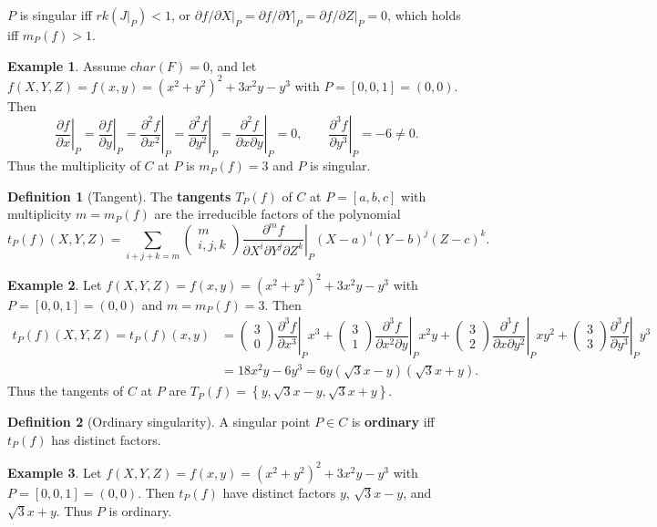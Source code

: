 \documentclass{article}
\newcommand{\val}[1]{\left. #1 \right\rvert}
\newcommand{\rb}[1]{\left( #1 \right)}
\renewcommand{\sb}[1]{\left[ #1 \right]}
\newcommand{\cb}[1]{\left\{ #1 \right\}}
\newcommand{\two}[2]{\begin{pmatrix} #1 \\ #2 \end{pmatrix}}
\theoremstyle{definition}\newtheorem*{definition}{Definition}
\theoremstyle{definition}\newtheorem*{example}{Example}
\theoremstyle{definition}\newtheorem*{remark}{Remark}
\begin{document}
$ P $ is singular iff $ rk\rb{\val{J}_P} < 1 $, or $ \val{\partial f / \partial X}_P = \val{\partial f / \partial Y}_P = \val{\partial f / \partial Z}_P = 0 $, which holds iff $ m_P\rb{f} > 1 $.

\begin{example}
Assume $ char\rb{F} = 0 $, and let $ f\rb{X, Y, Z} = f\rb{x, y} = \rb{x^2 + y^2}^2 + 3x^2y - y^3 $ with $ P = \sb{0, 0, 1} = \rb{0, 0} $. Then
$$ \val{\dfrac{\partial f}{\partial x}}_P = \val{\dfrac{\partial f}{\partial y}}_P = \val{\dfrac{\partial^2 f}{\partial x^2}}_P = \val{\dfrac{\partial^2 f}{\partial y^2}}_P = \val{\dfrac{\partial^2 f}{\partial x \partial y}}_P = 0, \qquad \val{\dfrac{\partial^3 f}{\partial y^3}}_P = -6 \ne 0. $$
Thus the multiplicity of $ C $ at $ P $ is $ m_P\rb{f} = 3 $ and $ P $ is singular.
\end{example}

\begin{definition}[Tangent]
The \textbf{tangents} $ T_P\rb{f} $ of $ C $ at $ P = \sb{a, b, c} $ with multiplicity $ m = m_P\rb{f} $ are the irreducible factors of the polynomial
$$ t_P\rb{f}\rb{X, Y, Z} = \sum_{i + j + k = m} \two{m}{i, j, k} \val{\dfrac{\partial^m f}{\partial X^i \partial Y^j \partial Z^k}}_P \rb{X - a}^i \rb{Y - b}^j \rb{Z - c}^k. $$
\end{definition}

\begin{example}
Let $ f\rb{X, Y, Z} = f\rb{x, y} = \rb{x^2 + y^2}^2 + 3x^2y - y^3 $ with $ P = \sb{0, 0, 1} = \rb{0, 0} $ and $ m = m_P\rb{f} = 3 $. Then
\begin{align*}
t_P\rb{f}\rb{X, Y, Z} = t_P\rb{f}\rb{x, y}
& = \two{3}{0}\val{\dfrac{\partial^3 f}{\partial x^3}}_Px^3 + \two{3}{1}\val{\dfrac{\partial^3 f}{\partial x^2 \partial y}}_Px^2y + \two{3}{2}\val{\dfrac{\partial^3 f}{\partial x \partial y^2}}_Pxy^2 + \two{3}{3}\val{\dfrac{\partial^3 f}{\partial y^3}}_Py^3 \\
& = 18x^2y - 6y^3 = 6y\rb{\sqrt{3}x - y}\rb{\sqrt{3}x + y}.
\end{align*}
Thus the tangents of $ C $ at $ P $ are $ T_P\rb{f} = \cb{y, \sqrt{3}x - y, \sqrt{3}x + y} $.
\end{example}

\begin{definition}[Ordinary singularity]
A singular point $ P \in C $ is \textbf{ordinary} iff $ t_P\rb{f} $ has distinct factors.
\end{definition}

\begin{example}
Let $ f\rb{X, Y, Z} = f\rb{x, y} = \rb{x^2 + y^2}^2 + 3x^2y - y^3 $ with $ P = \sb{0, 0, 1} = \rb{0, 0} $. Then $ t_P\rb{f} $ have distinct factors $ y $, $ \sqrt{3}x - y $, and $ \sqrt{3}x + y $. Thus $ P $ is ordinary.
\end{example}
\end{document}
